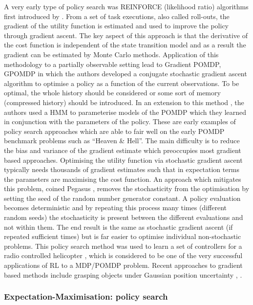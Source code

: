 A very early type of policy search was REINFORCE (likelihood ratio) algorithms
first introduced by \cite{reinforce_1992}. From a set of task executions, also called roll-outs, the gradient
of the utility function is estimated and used to improve the policy through gradient ascent. 
The key aspect of this approach is that the derivative of the cost function is independent of the state transition model 
and as a result the gradient can be estimated by Monte Carlo methods. Application of this methodology 
to a partially observable setting lead to Gradient POMDP, GPOMDP \cite{gpomdp_2000} in which the authors developed 
a conjugate stochastic gradient ascent algorithm to optimise a policy as a function of the current observations.
To be optimal, the whole history should be considered or some sort of memory (compressed history) should be introduced. 
In an extension to this method \cite{sis_pomdp_2002}, the authors used a HMM to parameterise models of the POMDP  which they 
learned in conjunction with the parameters of the policy. These are early examples of policy search approaches 
which are able to fair well on the early POMDP benchmark problems such as ``Heaven \& Hell''. 
The main difficulty is to reduce the bias and variance of the gradient estimate which preoccupies most gradient based approaches. 
Optimising the utility function via stochastic gradient ascent typically needs thousands of gradient estimates such that in expectation terms the parameters are maximising the cost function. 
An approach which mitigates this problem, coined Pegasus \citep{Pegasus_2000}, removes the stochasticity from the optimisation 
by setting the seed of the random number generator constant. A policy evaluation becomes deterministic and by repeating this process many times (different random seeds) the stochasticity
is present between the different evaluations and not within them. The end result is the same as stochastic gradient ascent 
(if repeated sufficient times) but is far easier to optimise individual non-stochastic problems. This policy search 
method was used to learn a set of controllers for a radio controlled helicopter \cite{heli_2004}, which is considered to 
be one of the very successful applications of RL to a MDP/POMDP problem. Recent approaches to gradient based methods
include grasping objects under Gaussian position uncertainty \cite{dmp_iros_2011}, \cite{dmp_seq_2012}.

\subsubsection{Expectation-Maximisation: policy search}

